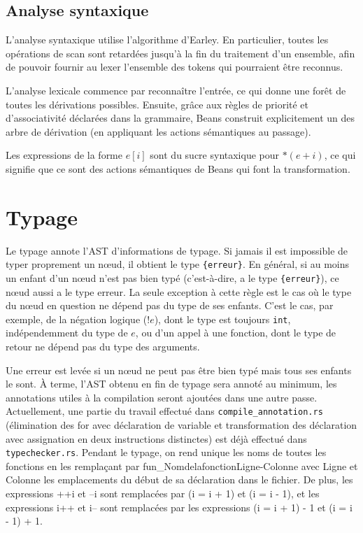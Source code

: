 \documentclass{scrartcl}
\begin{document}
\subsection*{Analyse syntaxique}
L'analyse syntaxique utilise l'algorithme d'Earley. En particulier, toutes les
opérations de scan sont retardées jusqu'à la fin du traitement d'un ensemble,
afin de pouvoir fournir au lexer l'ensemble des tokens qui pourraient être
reconnus.\par
L'analyse lexicale commence par reconnaître l'entrée, ce qui donne une forêt
de toutes les dérivations possibles. Ensuite, grâce aux règles de priorité et
d'associativité déclarées dans la grammaire, Beans construit explicitement
un des arbre de dérivation (en appliquant les actions sémantiques au passage).\par
Les expressions de la forme \(e[i]\) sont du sucre syntaxique pour \(*(e+i)\),
ce qui signifie que ce sont des actions sémantiques de Beans qui font la
transformation.

\section*{Typage}
Le typage annote l'AST d'informations de typage. Si jamais il est impossible
de typer proprement un n\oe{}ud, il obtient le type \verb|{erreur}|. En général,
si au moins un enfant d'un n\oe{}ud n'est pas bien typé (c'est-à-dire, a le type
\verb|{erreur}|), ce n\oe{}ud aussi a le type erreur. La seule exception à cette règle
est le cas où le type du n\oe{}ud en question ne dépend pas du type de ses enfants.
C'est le cas, par exemple, de la négation logique ($!e$), dont le type est
toujours \verb|int|, indépendemment du type de $e$, ou d'un appel à une fonction,
dont le type de retour ne dépend pas du type des arguments.\par
Une erreur est levée si un n\oe{}ud ne peut pas être bien typé mais tous ses enfants
le sont. À terme, l'AST obtenu en fin de typage sera annoté au minimum, les annotations
utiles à la compilation seront ajoutées dans une autre passe. Actuellement, une partie
du travail effectué dans \verb|compile_annotation.rs| (élimination des for avec déclaration de
variable et transformation des déclaration avec assignation en deux instructions distinctes)
est déjà effectué dans \verb|typechecker.rs|. Pendant le typage, on rend unique les noms de toutes
les fonctions en les remplaçant par fun_NomdelafonctionLigne-Colonne avec Ligne et Colonne les
emplacements du début de sa déclaration dans le fichier. De plus, les expressions ++i et --i
sont remplacées par (i = i + 1) et (i = i - 1), et les expressions i++ et i-- sont remplacées
par les expressions (i = i + 1) - 1 et (i = i - 1) + 1.
\end{document}
